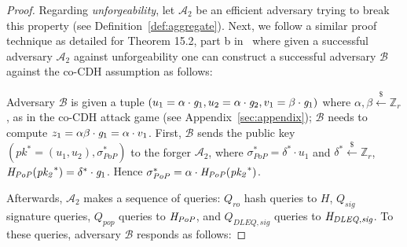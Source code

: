 \begin{proof}
\noindent Regarding \emph{unforgeability}, let $\mathcal{A}_2$ be an efficient adversary trying to break this property 
(see Definition~\ref{def:aggregate}). %
Next, we follow a similar proof technique as detailed for Theorem 15.2, part b in~\cite{dabo_book} where given a successful adversary 
$\mathcal{A}_2$ against unforgeability one can construct a successful adversary $\mathcal{B}$ against the co-CDH assumption as follows:

Adversary $\mathcal{B}$ is given a tuple $(u_1 = \alpha \cdot \mathit{g}_{1}, u_2 = \alpha \cdot \mathit{g}_{2}, v_1 = \beta \cdot \mathit{g}_{1})$ 
where $\alpha,\beta \xleftarrow{\$} \mathbb{Z}_{r}$, as in the co-CDH attack game (see Appendix~\ref{sec:appendix}); 
$\mathcal{B}$ needs to compute $z_1 = \alpha\beta \cdot \mathit{g}_{1} = \alpha \cdot v_1$. 
First, $\mathcal{B}$ sends the public key $(\mathit{pk}^* = (u_1, u_2), \sigma^{*}_{\mathit{PoP}})$ to the forger 
$\mathcal{A}_2$, where $\sigma^{*}_{\mathit{PoP}} = \delta^* \cdot u_1$ and 
$\delta^* \xleftarrow{\$} \mathbb{Z}_r$, $\mathit{H}_{\mathit{PoP}}(\mathit{pk_2}^*) = \delta^* \cdot \mathit{g}_{1}$. 
Hence $\sigma^{*}_{\mathit{PoP}} =  \alpha \cdot \mathit{H}_{\mathit{PoP}}(\mathit{pk_2}^*)$.  

Afterwards, $\mathcal{A}_2$ makes a sequence of queries: $Q_{\mathit{ro}}$ hash queries to $H$, $Q_{\mathit{sig}}$ signature queries, 
$Q_{\mathit{pop}}$ queries to $\mathit{H}_{\mathit{PoP}}$, %
and $Q_{\mathit{DLEQ},\mathit{sig}}$ queries to $\mathit{H}_{\mathit{DLEQ}, \mathit{sig}}$. To these queries, 
adversary $\mathcal{B}$ responds as follows:


\end{proof}
